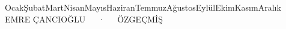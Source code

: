 \documentclass[11pt, a4paper]{awesome-cv}
\newcommand{\turkishtoday}{%
  \ifcase\month\or Ocak\or Şubat\or Mart\or Nisan\or Mayıs\or Haziran\or Temmuz\or Ağustos\or Eylül\or Ekim\or Kasım\or Aralık\fi\ \number\year
}
\begin{document}
\makecvheader[L]
\vspace{-10mm}

\makecvfooter
  {\turkishtoday}
  {EMRE ÇANCIOĞLU~~~·~~~ÖZGEÇMİŞ}
  {\thepage}









\end{document}
